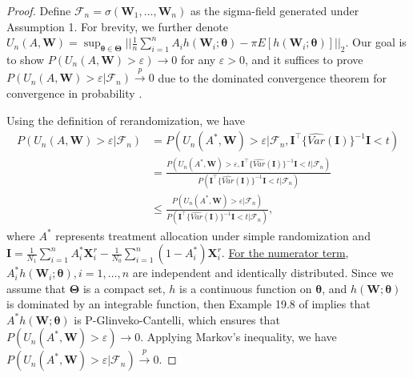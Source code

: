 \documentclass[12pt]{article}
\newcommand{\bX}{\boldsymbol{X}}
\newcommand{\bW}{\boldsymbol{W}}
\newcommand{\bI}{\boldsymbol{I}}
\newcommand{\btheta}{\boldsymbol{\theta}}
\newcommand{\bTheta}{\boldsymbol{\Theta}}
\begin{document}
\begin{proof}
Define $\mathcal{F}_n = \sigma(\bW_1,\dots,\bW_n)$ as the sigma-field generated under Assumption 1. For brevity, we further denote $U_n(A,\bW) = \sup_{\btheta \in \bTheta}||\frac{1}{n} \sum_{i=1}^n A_i h(\bW_i;\btheta) - \pi E[h(\bW_i;\btheta)]||_2$. Our goal is to show $P(U_n(A,\bW) > \varepsilon) \rightarrow 0$ for any $\varepsilon >0$, and it suffices to prove $P(U_n(A,\bW) > \varepsilon | \mathcal{F}_n) \xrightarrow{p} 0$ due to the dominated convergence theorem for convergence in probability \citep[Theorem 1.5.3]{durrett2019probability}. 

Using the definition of rerandomization, we have 
\begin{align*}
    P\left(U_n(A,\bW) > \varepsilon | \mathcal{F}_n\right) &= P\left(U_n(A^*,\bW) > \varepsilon | \mathcal{F}_n, \bI^\top \{\widehat{Var}(\bI)\}^{-1} \bI < t\right) \\
    &= \frac{ P\left(U_n(A^*,\bW) > \varepsilon, \bI^\top \{\widehat{Var}(\bI)\}^{-1} \bI < t | \mathcal{F}_n\right)}{P\left(\bI^\top \{\widehat{Var}(\bI)\}^{-1} \bI < t | \mathcal{F}_n\right)} \\
    &\le \frac{ P\left(U_n(A^*,\bW) > \varepsilon | \mathcal{F}_n\right)}{P\left(\bI^\top \{\widehat{Var}(\bI)\}^{-1} \bI < t | \mathcal{F}_n\right)},
\end{align*}
where $A^*$ represents treatment allocation under simple randomization and $\bI = \frac{1}{N_1} \sum_{i=1}^n A_i^* \bX^r_i - \frac{1}{N_0} \sum_{i=1}^n (1-A_i^*) \bX^r_i$. \underline{For the numerator term}, $A_i^* h(\bW_i;\btheta), i = 1,\dots, n$ are independent and identically distributed. Since we assume that $\bTheta$ is a compact set, $h$ is a continuous function on $\btheta$, and  $h(\bW;\btheta)$ is dominated by an integrable function, then Example 19.8 of \cite{vaart_1998} implies that $A^* h(\bW;\btheta)$ is P-Glinveko-Cantelli, which ensures that $P\left(U_n(A^*,\bW) > \varepsilon\right) \rightarrow 0$. Applying Markov's inequality, we have $P\left(U_n(A^*,\bW) > \varepsilon| \mathcal{F}_n\right) \xrightarrow{p} 0$.

\end{proof}
\end{document}
